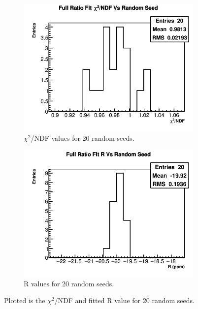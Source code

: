 		\begin{figure}[]
		\centering
		    \begin{subfigure}[t]{0.45\textwidth}
			    \centering
				\includegraphics[width=\textwidth]{RatioCBO_Chi2NDF_Vs_Iter_Canv_hist}
			    \caption{$\chi^{2}$/NDF values for 20 random seeds.}
		    \end{subfigure}
		    \begin{subfigure}[t]{0.45\textwidth}
			    \centering
				\includegraphics[width=\textwidth]{RatioCBO_R_Vs_Iter_Canv_hist}
			    \caption{R values for 20 random seeds.}
			\label{Subfig:RVsRandomSeed}
		    \end{subfigure}%
		\caption[RandomSeeds]{Plotted is the $\chi^{2}$/NDF and fitted R value for 20 random seeds.}
		\label{fig:RandomSeeds}
		\end{figure}

